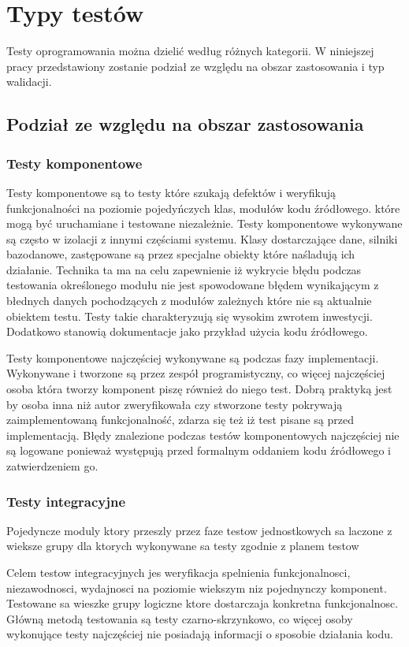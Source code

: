 \section{Typy testów}
Testy oprogramowania można dzielić według różnych kategorii. W niniejszej pracy przedstawiony zostanie podział ze względu na obszar zastosowania i typ walidacji.
 
\subsection{Podział ze względu na obszar zastosowania}
\subsubsection{Testy komponentowe}
Testy komponentowe są to testy które szukają defektów i weryfikują funkcjonalności na poziomie pojedyńczych klas, modułów kodu źródłowego. które mogą być uruchamiane i testowane niezależnie. Testy komponentowe wykonywane są często w izolacji z innymi częściami systemu. Klasy dostarczające dane, silniki bazodanowe, zastępowane są przez specjalne obiekty które naśladują ich działanie. Technika ta ma na celu zapewnienie iż wykrycie błędu podczas testowania określonego modułu nie jest spowodowane błędem wynikającym z błednych danych pochodzących z modułów zależnych które nie są aktualnie obiektem testu. Testy takie charakteryzują się wysokim zwrotem inwestycji. Dodatkowo stanowią dokumentacje jako przykład użycia kodu źródłowego.

Testy komponentowe najczęściej wykonywane są podczas fazy implementacji. Wykonywane i tworzone są przez zespół programistyczny, co więcej najczęściej osoba która tworzy komponent piszę również do niego test. Dobrą praktyką jest by osoba inna niż autor zweryfikowała czy stworzone testy pokrywają zaimplementowaną funkcjonalność, zdarza się też iż test pisane są przed implementacją. Błędy znalezione podczas testów komponentowych najczęściej nie są logowane ponieważ występują przed formalnym oddaniem kodu źródłowego i zatwierdzeniem go.

\subsubsection{Testy integracyjne} 
Pojedyncze moduly ktory przeszly przez faze testow jednostkowych sa laczone z wieksze grupy dla ktorych wykonywane sa testy zgodnie z planem testow

Celem testow integracyjnych jes weryfikacja spelnienia funkcjonalnosci, niezawodnosci, wydajnosci na poziomie wiekszym niz pojednynczy komponent. Testowane sa wieszke grupy logiczne ktore dostarczaja konkretna funkcjonalnosc. Główną metodą testowania są testy czarno-skrzynkowo, co więcej osoby wykonujące testy najczęściej nie posiadają informacji o sposobie działania kodu.

